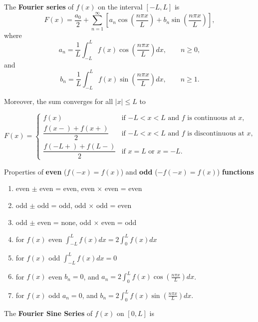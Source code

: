 \documentclass[11pt]{article}
\begin{document}
\begin{preamble}
\begin{formulaitem}

\item The \textbf{Fourier series} of $f(x)$ on the interval $[-L, L]$ is 
\[F(x) = \dfrac{a_{0}}{2} + \sum_{n=1}^{\infty} \left[ a_{n}\cos\left(\dfrac{n\pi x}{L}\right)+b_{n}\sin\left(\dfrac{n\pi x}{L}\right) \right],\]
where
\[a_{n} = \dfrac{1}{L} \int_{-L}^{L} f(x)\cos\left(\dfrac{n\pi x}{L}\right) dx, \qquad n\geq 0, \]
and 
\[b_{n} = \dfrac{1}{L} \int_{-L}^{L} f(x)\sin\left(\dfrac{n\pi x}{L}\right) dx, \qquad n\geq 1.\]

Moreover, the sum converges  for all $|x|\leq L$ to

\begin{equation*}
F(x) = \begin{cases} f(x) & \text{if $-L<x<L$ and $f$ is continuous at $x$,} \\[0.5em]
                                 \dfrac{f(x-)+f(x+)}{2} & \text{if $-L<x<L$ and $f$ is discontinuous at $x$,} \\[0.5em]
                                 \dfrac{f(-L+)+f(L-)}{2} & \text{if $x=L$ or $x=-L$.} \end{cases} 
\end{equation*}

\item Properties of \textbf{even} ($f(-x)=f(x)$) and \textbf{odd} ($-f(-x)=f(x)$) \textbf{functions}
\begin{enumerate}
     \item even $\pm$ even = even, \quad even $\times$ even = even
     \item odd $\pm$ odd = odd, \quad odd $\times$ odd = even
     \item odd $\pm$ even = none, \quad odd $\times$ even = odd
     \item for $f(x)$ even $\int_{-L}^{L}f(x)dx= 2\int_{0}^{L}f(x)dx$
     \item for $f(x)$ odd $\int_{-L}^{L}f(x)dx= 0$
     \item for $f(x)$ even $b_{n}=0$, and $a_{n}=2\int_{0}^{L}f(x)\cos\left( \tfrac{n\pi x}{L} \right)dx$.
     \item for $f(x)$ odd  $a_{n}=0$, and $b_{n}=2\int_{0}^{L}f(x)\sin\left( \tfrac{n\pi x}{L} \right)dx$.
\end{enumerate}

\item The \textbf{Fourier Sine Series} of $f(x)$ on $[0,L]$ is


\end{formulaitem}
\end{preamble}
\end{document}
